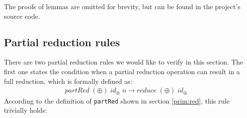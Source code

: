 \documentclass{l4proj}
\begin{document}
The proofs of lemmas are omitted for brevity, but can be found in the project's source code.
\subsection{Partial reduction rules}
\label{alg:partred}
There are two partial reduction rules we would like to verify in this section. The first one states the condition when a partial reduction operation can result in a full reduction, which is formally defined as:
\begin{align}
    partRed\; (\oplus)\; id_\oplus\; n \to reduce\; (\oplus)\; id_\oplus
\end{align}
According to the definition of \texttt{partRed} shown in section \ref{prim:red}, this rule trivially holds:
\begin{code}%
\>[0]\<%
\\
\>[0]\AgdaSpace{}%
\AgdaSymbol{:}%
\>[2112I]\AgdaSymbol{\{}\AgdaSpace{}%
\AgdaSymbol{:}\AgdaSpace{}%
\AgdaSymbol{\}}\AgdaSpace{}%
\AgdaSpace{}%
\AgdaSymbol{(}\AgdaSpace{}%
\AgdaSymbol{:}\AgdaSpace{}%
\AgdaSymbol{)}\AgdaSpace{}%
\<%
\\
\>[.][@{}l@{}]\<[2112I]%
\>[20]\AgdaSymbol{(}\AgdaSpace{}%
\AgdaSymbol{:}\AgdaSpace{}%
\AgdaSpace{}%
\AgdaSymbol{)}\AgdaSpace{}%
\AgdaSpace{}%
\AgdaSymbol{(}\AgdaSpace{}%
\AgdaSymbol{:}\AgdaSpace{}%
\AgdaSpace{}%
\AgdaSpace{}%
\AgdaSymbol{)}\AgdaSpace{}%
\<%
\\
%
\>[20]\AgdaSpace{}%
\AgdaSpace{}%
\AgdaSpace{}%
\AgdaSpace{}%
\AgdaSpace{}%
\AgdaOperator{\AgdaFunction{[}}\AgdaSpace{}%
\AgdaSpace{}%
\AgdaSpace{}%
\AgdaSpace{}%
\AgdaOperator{\AgdaFunction{]}}\<%
\\
\>[0]\AgdaSpace{}%
\AgdaSpace{}%
\AgdaSpace{}%
\AgdaInductiveConstructor{[]}\AgdaSpace{}%
\AgdaSymbol{=}\AgdaSpace{}%
\<%
\\
\>[0]\AgdaSpace{}%
\AgdaSymbol{(}\AgdaSpace{}%
\AgdaSymbol{)}\AgdaSpace{}%
\AgdaSpace{}%
\AgdaSpace{}%
\AgdaSymbol{=}\AgdaSpace{}%
\<%
\end{code}
\end{document}
